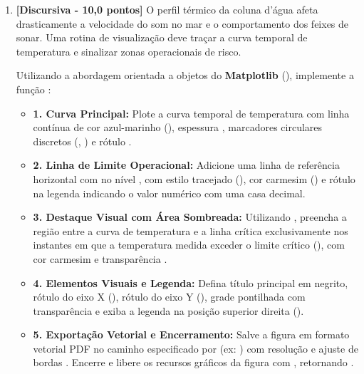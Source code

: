 \begin{enumerate}[label=\textbf{Q\arabic*.}]


\vspace{0.5cm}

\item \textbf{[Discursiva - 10,0 pontos]} O perfil térmico da coluna d'água afeta drasticamente a velocidade do som no mar e o comportamento dos feixes de sonar. Uma rotina de visualização deve traçar a curva temporal de temperatura e sinalizar zonas operacionais de risco.

Utilizando a abordagem orientada a objetos do \textbf{Matplotlib} (), implemente a função :
\begin{itemize}[leftmargin=*]
    \item \textbf{1. Curva Principal:}\newline
    Plote a curva temporal de temperatura com linha contínua de cor azul-marinho (), espessura , marcadores circulares discretos (, ) e rótulo .
    \item \textbf{2. Linha de Limite Operacional:}\newline
    Adicione uma linha de referência horizontal com  no nível , com estilo tracejado (), cor carmesim () e rótulo na legenda indicando o valor numérico com uma casa decimal.
    \item \textbf{3. Destaque Visual com Área Sombreada:}\newline
    Utilizando , preencha a região entre a curva de temperatura e a linha crítica exclusivamente nos instantes em que a temperatura medida exceder o limite crítico (), com cor carmesim e transparência .
    \item \textbf{4. Elementos Visuais e Legenda:}\newline
    Defina título principal em negrito, rótulo do eixo X (), rótulo do eixo Y (), grade pontilhada com transparência e exiba a legenda na posição superior direita ().
    \item \textbf{5. Exportação Vetorial e Encerramento:}\newline
    Salve a figura em formato vetorial PDF no caminho especificado por  (ex: ) com resolução  e ajuste de bordas . Encerre e libere os recursos gráficos da figura com , retornando .
\end{itemize}


\end{enumerate}
